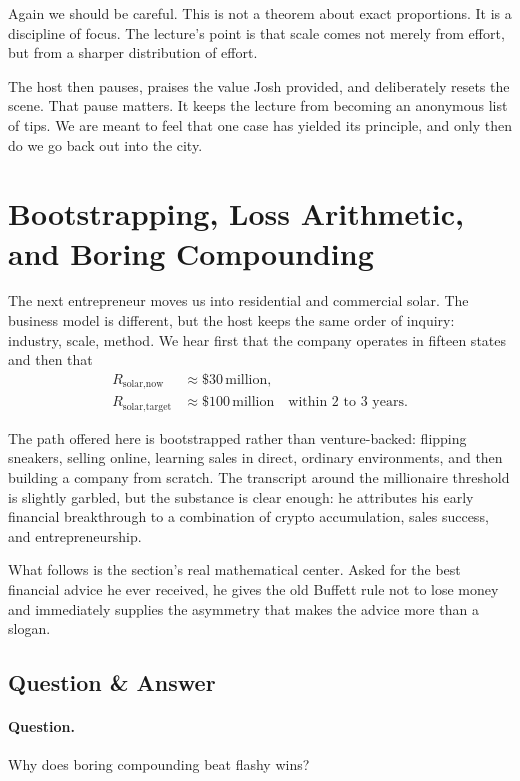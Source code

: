 Again we should be careful. This is not a theorem about exact proportions. It is a discipline of focus. The lecture's point is that scale comes not merely from effort, but from a sharper distribution of effort.

The host then pauses, praises the value Josh provided, and deliberately resets the scene. That pause matters. It keeps the lecture from becoming an anonymous list of tips. We are meant to feel that one case has yielded its principle, and only then do we go back out into the city.

\section{Bootstrapping, Loss Arithmetic, and Boring Compounding}

The next entrepreneur moves us into residential and commercial solar. The business model is different, but the host keeps the same order of inquiry: industry, scale, method. We hear first that the company operates in fifteen states and then that
\begin{align}
R_{\text{solar,now}} &\approx \$30\,\text{million},\\
R_{\text{solar,target}} &\approx \$100\,\text{million}
\quad \text{within }2\text{ to }3\text{ years.}
\end{align}

The path offered here is bootstrapped rather than venture-backed: flipping sneakers, selling online, learning sales in direct, ordinary environments, and then building a company from scratch. The transcript around the millionaire threshold is slightly garbled, but the substance is clear enough: he attributes his early financial breakthrough to a combination of crypto accumulation, sales success, and entrepreneurship.

What follows is the section's real mathematical center. Asked for the best financial advice he ever received, he gives the old Buffett rule not to lose money and immediately supplies the asymmetry that makes the advice more than a slogan.

\subsection{Question \& Answer}

\paragraph{Question.} Why does boring compounding beat flashy wins?

